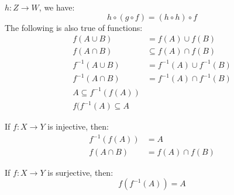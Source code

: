             $h:Z\rightarrow{W}$, we have:
            \begin{equation}
                h\circ(g\circ{f})=(h\circ{h})\circ{f}
            \end{equation}
            The following is also true of functions:
            \begin{subequations}
                \begin{align}
                    f(A\cup{B})&=f(A)\cup{f}(B)\\
                    f(A\cap{B})&\subseteq{f}(A)\cap{f}(B)\\
                    f^{\minus{1}}(A\cup{B})
                        &=f^{\minus{1}}(A)\cup{f}^{\minus{1}}(B)\\
                    f^{\minus{1}}(A\cap{B})
                        &=f^{\minus{1}}(A)\cap{f}^{\minus{1}}(B)\\
                    A\subseteq{f}^{\minus{1}}(f(A))\\
                    f(f^{\minus{1}}(A)\subseteq{A}
                \end{align}
            \end{subequations}
            \begin{theorem}
                If $f:X\rightarrow{Y}$ is injective, then:
                \begin{subequations}
                    \begin{align}
                        f^{\minus{1}}(f(A))&=A\\
                        f(A\cap{B})&=f(A)\cap{f}(B)
                    \end{align}
                \end{subequations}
            \end{theorem}
            \begin{theorem}
                If $f:X\rightarrow{Y}$ is surjective, then:
                \begin{equation}
                    f(f^{\minus{1}}(A))=A
                \end{equation}
            \end{theorem}
